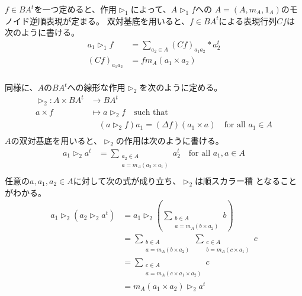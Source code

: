 	$f\in BA^t$を一つ定めると、作用$\rhd_1$によって、$A\rhd_1 f$への
	$A=(A,m_A,1_A)$のモノイド逆順表現が定まる。
	双対基底を用いると、$f\in BA^t$による表現行列$Cf$は次のように書ける。
	\begin{equation}\begin{split} %
		a_1\rhd_1 f &= \sum_{a_2\in A}(Cf)_{a_1a_2}*a_2^t \\
		(Cf)_{a_1a_2} &= fm_A(a_1\times a_2) \\
	\end{split}\end{equation} %

	同様に、$A$の$BA^t$への線形な作用$\rhd_2$を次のように定める。
	\begin{equation}\begin{split} %
		\rhd_2: A\times BA^t &\to BA^t \\
			a\times f &\mapsto a\rhd_2 f \quad\text{such that} \\ 
				&\quad (a\rhd_2 f)a_1 = (\Delta f)(a_1\times a) \quad \text{for all }a_1\in A \\
	\end{split}\end{equation} %
	$A$の双対基底を用いると、$\rhd_2$の作用は次のように書ける。
	\begin{equation}\begin{split} %
		a_1\rhd_2 a^t &= \sum_{\substack{a_2\in A\\a=m_A(a_2\times a_1)}}a_2^t
			\quad \text{for all }a_1,a\in A \\
	\end{split}\end{equation} %
	任意の$a,a_1,a_2\in A$に対して次の式が成り立ち、$\rhd_2$は順スカラー積
	となることがわかる。
	\begin{equation}\begin{split} %
		a_1\rhd_2(a_2\rhd_2 a^t) 
			&= a_1\rhd_2(\sum_{\substack{b\in A\\a=m_A(b\times a_2)}}b) \\
			&= \sum_{\substack{b\in A\\a=m_A(b\times a_2)}} \sum_{\substack{c\in A\\b=m_A(c\times a_1)}}c \\
			&= \sum_{\substack{c\in A\\a=m_A(c\times a_1\times a_2)}}c \\
			&= m_A(a_1\times a_2)\rhd_2 a^t \\
	\end{split}\end{equation} %

